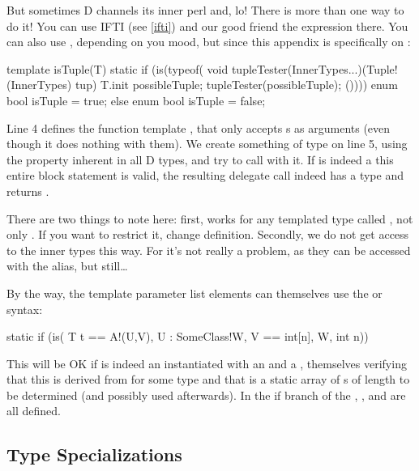 But sometimes D channels its inner perl and, lo! There is more than one way to do it! You can use IFTI (see \ref{ifti}) and our good friend the \DD{(} expression there. You can also use , depending on you mood, but since this appendix is specifically on :

\begin{ndcode}
template isTuple(T)
{
    static if (is(typeof({
              void tupleTester(InnerTypes...)(Tuple!(InnerTypes) tup) {}
              T.init possibleTuple;
              tupleTester(possibleTuple);
              }())))
        enum bool isTuple = true;
    else
        enum bool isTuple = false;
}
\end{ndcode}

Line 4 defines the function template , that only accepts s as arguments (even though it does nothing with them). We create something of type  on line 5, using the  property inherent in all D types, and try to call  with it. If  is indeed a  this entire block statement is valid, the resulting delegate call indeed has a type and  returns .

There are two things to note here: first,  works for any templated type called , not only . If you want to restrict it, change  definition. Secondly, we do not get access to the inner types this way. For  it's not really a problem, as they can be accessed with the  alias, but still\ldots

By the way, the template parameter list elements can themselves use the  or  syntax:

\begin{dcode}
static if (is( T t == A!(U,V), U : SomeClass!W, V == int[n], W, int n))
\end{dcode}

This will be OK if  is indeed an  instantiated with an  and a , themselves verifying that this  is derived from  for some  type and that  is a static array of s of length  to be determined (and possibly used afterwards). In the if branch of the  , ,  and  are all defined. 

\subsection{Type Specializations}\label{typespecializations}

